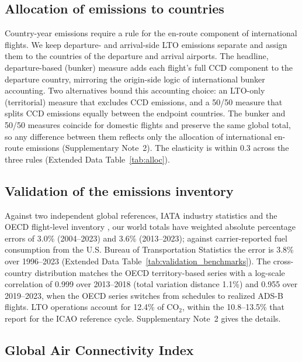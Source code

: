 \documentclass[12pt]{extarticle}
\begin{document}
\subsection*{Allocation of emissions to countries}

Country-year emissions require a rule for the en-route component of international flights. We keep departure- and arrival-side LTO emissions separate and assign them to the countries of the departure and arrival airports. The headline, departure-based (bunker) measure adds each flight's full CCD component to the departure country, mirroring the origin-side logic of international bunker accounting. Two alternatives bound this accounting choice: an LTO-only (territorial) measure that excludes CCD emissions, and a 50/50 measure that splits CCD emissions equally between the endpoint countries. The bunker and 50/50 measures coincide for domestic flights and preserve the same global total, so any difference between them reflects only the allocation of international en-route emissions (Supplementary Note~2). The elasticity is within 0.3 across the three rules (Extended Data Table~\ref{tab:alloc}).

\subsection*{Validation of the emissions inventory}

Against two independent global references, IATA industry statistics \citep{iata2018,iata2019,iata2024} and the OECD flight-level inventory \citep{clarke2022}, our world totals have weighted absolute percentage errors of 3.0\% (2004--2023) and 3.6\% (2013--2023); against carrier-reported fuel consumption from the U.S. Bureau of Transportation Statistics the error is 3.8\% over 1996--2023 (Extended Data Table~\ref{tab:validation_benchmarks}). The cross-country distribution matches the OECD territory-based series with a log-scale correlation of 0.999 over 2013--2018 (total variation distance 1.1\%) and 0.955 over 2019--2023, when the OECD series switches from schedules to realized ADS-B flights. LTO operations account for 12.4\% of CO$_2$, within the 10.8--13.5\% that \citet{quadros2022} report for the ICAO reference cycle. Supplementary Note~2 gives the details.

\subsection*{Global Air Connectivity Index}
\end{document}
